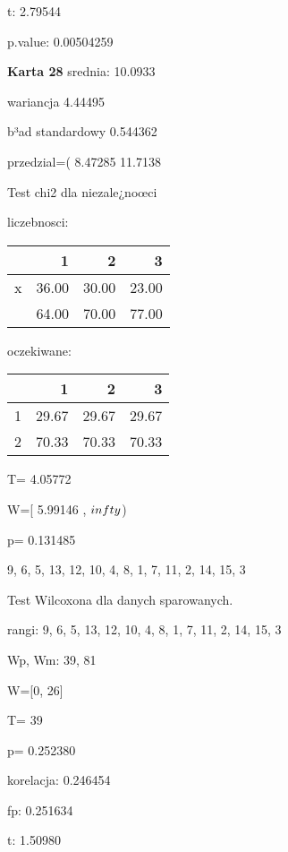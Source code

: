 \documentclass[a4paper,12pt]{article}
\begin{document}
\begin{multicols}{3}
     t: 2.79544
     
     p.value: 0.00504259 \vspace{1cm} 

  \textbf{Karta  28 } 
 srednia: 10.0933 
     
     wariancja 4.44495  
     
     b³ad standardowy 0.544362 
     
     przedzial=( 8.47285 11.7138 \vspace{1cm} 

  Test chi2 dla niezale¿noœci 
   
   liczebnosci: %
\begin{tabular}{rrrr}
  \hline
 & 1 & 2 & 3 \\
  \hline
x & 36.00 & 30.00 & 23.00 \\
   & 64.00 & 70.00 & 77.00 \\
   \hline
\end{tabular}
 
   
   oczekiwane: %
\begin{tabular}{rrrr}
  \hline
 & 1 & 2 & 3 \\
  \hline
1 & 29.67 & 29.67 & 29.67 \\
  2 & 70.33 & 70.33 & 70.33 \\
   \hline
\end{tabular}
 
   
   T= 4.05772 
   
   W=[ 5.99146 , $\\infty$) 
   
   p= 0.131485 \vspace{1cm} 

  9, 6, 5, 13, 12, 10, 4, 8, 1, 7, 11, 2, 14, 15, 3 

  Test Wilcoxona dla danych sparowanych. 
  
  rangi: 9, 6, 5, 13, 12, 10, 4, 8, 1, 7, 11, 2, 14, 15, 3 
  
  Wp, Wm:  39,  81 
  
  W=[0, 26]  
  
  T=  39 
  
  p= 0.252380 \vspace{1cm} 

  korelacja: 0.246454
     
     fp: 0.251634
     
     t: 1.50980
     

\end{multicols}
\end{document}

